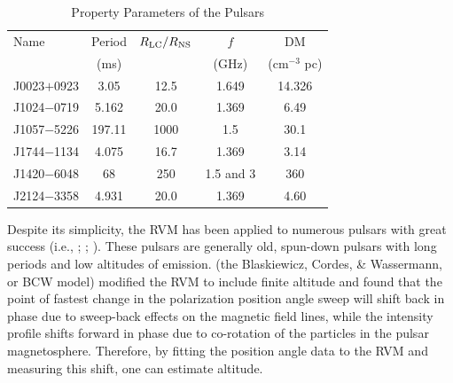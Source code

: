         \begin{table}[ht]
	\small
        \caption{Property Parameters of the Pulsars}
        \begin{center}
        {
        \begin{tabular}{lcccc}
        \hline & \\[-1em]\hline

        Name            &Period     &$R_{\rm{LC}}/R_{\rm{NS}}$     &$f$       &DM           \\%
			&(ms)	    &			 &(GHz)	    &(cm$^{-3}$ pc) \\
        [.3em]\hline 
        J0023$+$0923      &3.05           &12.5                    &1.649          &14.326                 %
\\ \hline
        J1024$-$0719      &5.162          &20.0                    &1.369          &6.49                   %
\\ \hline
        J1057$-$5226      &197.11         &1000                   &1.5            &30.1                   %
\\ \hline
        J1744$-$1134      &4.075          &16.7                    &1.369          &3.14                   %
\\ \hline
        J1420$-$6048      &68             &250                   &1.5 and 3      &360                    %
\\ \hline
        J2124$-$3358      &4.931          &20.0                    &1.369          &4.60                   %
\\ \hline


        \end{tabular}}
        \label{tb:pulsarParam}
        \end{center}
        \end{table}



Despite its simplicity, the RVM has been applied to numerous pulsars with great
success (i.e., \citealp{lyne1988shape}; \citealp{phillips1990magnetic}; \citealp{everett2001emission}).  
These pulsars are generally old, spun-down pulsars
with long periods and low altitudes of emission.
\cite{blaskiewicz1991relativistic} (the Blaskiewicz, Cordes, \& Wassermann, or BCW model) 
modified the RVM to include
finite altitude and found that the point of fastest change
in the polarization position angle sweep will shift back in phase
due to sweep-back effects on the magnetic field lines, while the intensity
profile shifts forward in phase due to co-rotation of the particles
in the pulsar magnetosphere.  Therefore, by fitting the position angle
data to the RVM and measuring this shift, one can estimate altitude.

